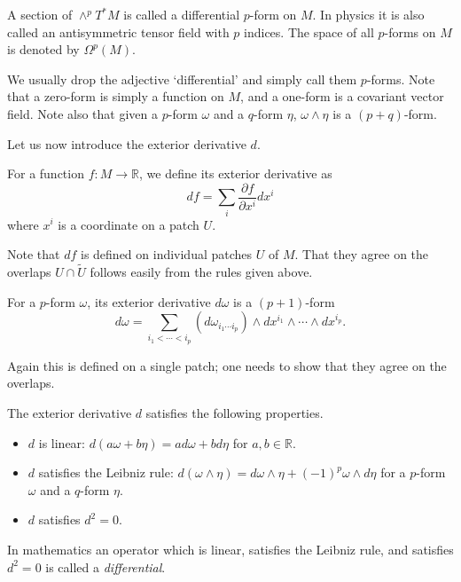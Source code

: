 \documentclass[12pt]{article}
\numberwithin{equation}{section}
\numberwithin{figure}{section}
\theoremstyle{remark}
\def\bR{\mathbb{R}}
\begin{document}
\begin{definition}
A section of $\wedge^p T^*M$ is called a differential $p$-form on $M$.
In physics it is also called an antisymmetric tensor field with $p$ indices.
The space of all $p$-forms on $M$ is denoted by $\Omega^p(M)$.
\end{definition}

We usually drop the adjective `differential' and simply call them $p$-forms.
Note that a zero-form is simply a function on $M$,
and a one-form is a covariant vector field.
Note also that given a $p$-form $\omega$ and a $q$-form $\eta$,
$\omega\wedge\eta$ is a $(p+q)$-form.


Let us now introduce the exterior derivative $d$.
\begin{definition}
For a function $f:M\to \bR$, we define its exterior derivative as \begin{equation}
df = \sum_i \frac{\partial f}{\partial x^i} dx^i
\end{equation} where $x^i$ is a coordinate on a patch $U$.
\end{definition}
Note that $df$ is defined on individual patches $U$ of $M$.
That they agree on the overlaps $U\cap \tilde U$ follows easily from the rules given above.

\begin{definition}
  For a $p$-form $\omega$, its exterior derivative $d\omega$ is a $(p+1)$-form \begin{equation}
    d\omega = \sum_{i_1<\cdots<i_p} (d\omega_{i_1\cdots i_p}) \wedge dx^{i_1}\wedge \cdots \wedge dx^{i_p}.
  \end{equation}
\end{definition}
Again this is defined on a single patch; one needs to show that they agree on the overlaps.

\begin{proposition}
  The exterior derivative $d$ satisfies the following properties.
  \begin{itemize}
    \item $d$ is linear: $d(a \omega + b \eta) = a d\omega + b d\eta$ for  $a,b\in \bR$.
    \item $d$ satisfies the Leibniz rule: $d(\omega\wedge \eta) = d\omega \wedge \eta + (-1)^p \omega \wedge d\eta$ for a $p$-form $\omega$ and a $q$-form $\eta$.
    \item $d$ satisfies $d^2=0$. 
  \end{itemize}
\end{proposition}
In mathematics an operator which is linear, satisfies the Leibniz rule, and satisfies $d^2=0$ is called a \emph{differential}.
\end{document}
